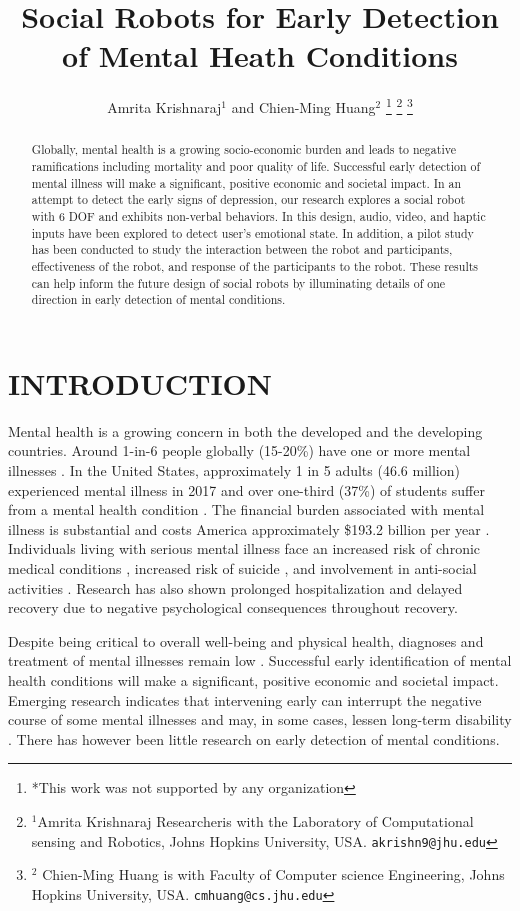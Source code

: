 \documentclass[letterpaper, 10 pt, conference]{ieeeconf}  %
\title{\LARGE \bf
Social Robots for Early Detection of Mental Heath Conditions
}
\author{Amrita Krishnaraj$^{1}$ and Chien-Ming Huang$^{2}$%
\thanks{*This work was not supported by any organization}%
\thanks{$^{1}$Amrita Krishnaraj Researcheris with the Laboratory of Computational sensing and Robotics,
        Johns Hopkins University, USA.
        {\tt\small akrishn9@jhu.edu}}%
\thanks{$^{2}$ Chien-Ming Huang is with Faculty of Computer science Engineering, Johns Hopkins University, USA.
        {\tt\small cmhuang@cs.jhu.edu}}%
}
\begin{document}
\maketitle
\thispagestyle{empty}
\pagestyle{empty}


\begin{abstract}

Globally, mental health is a growing socio-economic burden and leads to negative ramifications including mortality and poor quality of life. Successful early detection of mental illness will make a significant, positive economic and societal impact. In an attempt to detect the early signs of depression, our research explores a social robot with 6 DOF and exhibits non-verbal behaviors. In this design, audio, video, and haptic inputs have been explored to detect user's emotional state. In addition, a pilot study has been conducted to study the interaction between the robot and participants, effectiveness of the robot, and response of the participants to the robot. These results can help inform the future design of social robots by illuminating details of one direction in early detection of mental conditions.

\end{abstract}


\section{INTRODUCTION}

Mental health is a growing concern in both the developed and the developing countries. Around 1-in-6 people globally (15-20\%) have one or more mental illnesses \cite{}. In the United States, approximately 1 in 5 adults (46.6 million) experienced mental illness in 2017 \cite{} and over one-third (37\%) of students suffer from a mental health condition \cite{}. The financial burden associated with mental illness is substantial and costs America approximately \$193.2 billion per year \cite{}. Individuals living with serious mental illness face an increased risk of chronic medical conditions \cite{}, increased risk of suicide \cite{}, and involvement in anti-social activities \cite{}. Research has also shown prolonged hospitalization and delayed recovery due to negative psychological consequences throughout recovery.

Despite being critical to overall well-being and physical health, diagnoses and treatment of mental illnesses remain low \cite{}. Successful early identification of mental health conditions will make a significant, positive economic and societal impact. Emerging research indicates that intervening early can interrupt the negative course of some mental illnesses and may, in some cases, lessen long-term disability \cite{}. There has however been little research on early detection of mental conditions. 
\end{document}
